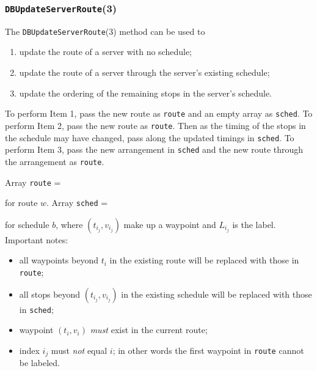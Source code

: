 \documentclass{article}
\theoremstyle{definition}                   %
\begin{document}
\subsubsection{{\tt{}\protect{}DBUpdateServerRoute}(3)}
The {\tt{}\protect{}DBUpdateServerRoute}(3) method can be used to
\begin{enumerate}
\item update the route of a server with no schedule;
\item update the route of a server through the server's existing schedule;
\item update the ordering of the remaining stops in the server's schedule.
\end{enumerate}
To perform Item 1, pass the new route as {\tt{}route} and an empty array as
{\tt{}sched}. To perform Item 2, pass the new route as {\tt{}route}. Then as the
timing of the stops in the schedule may have changed, pass along the updated
timings in {\tt{}sched}. To perform Item 3, pass the new arrangement in {\tt{}sched}
and the new route through the arrangement as {\tt{}route}.

Array {\tt{}route} =

\noindent
{}

\noindent for route $w$. Array {\tt{}sched} =

\noindent
{}

\noindent for schedule $b$, where $(t_{i_j},v_{i_j})$ make up a waypoint and
$L_{i_j}$ is the label. Important notes:
\begin{itemize}
\item all waypoints beyond $t_i$ in the existing route will be replaced with
those in {\tt{}route};
\item all stops beyond $(t_{i_j},v_{i_j})$ in the existing schedule will be
replaced with those in {\tt{}sched};
\item waypoint $(t_i,v_i)$ \emph{must} exist in the current route;
\item index $i_j$ must \emph{not} equal $i$; in other words the first waypoint
in {\tt{}route} cannot be labeled.
\end{itemize}
\end{document}
